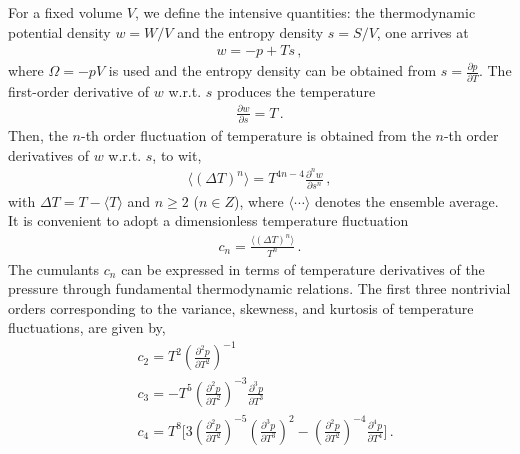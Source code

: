 \documentclass[aps,twocolumn,
prl,
superscriptaddress,nofootinbib,floatfix]{revtex4-2}
\begin{document}
For a fixed volume $V$, we define the intensive quantities:  the thermodynamic potential density $w=W/V$ and the entropy density $s=S/V$, one arrives at
\begin{align}
    w=-p+T s\,, \label{}
\end{align}
where $\Omega=-pV$ is used and the entropy density can be obtained from  $s=\frac{\partial p}{\partial T}$. The first-order derivative of $w$ w.r.t. $s$ produces the temperature
\begin{align}
    \frac{\partial w}{\partial s}=T\,. \label{}
\end{align}
Then, the $n$-th order fluctuation of temperature is obtained from the $n$-th order derivatives of $w$ w.r.t. $s$, to wit,
\begin{align}
    \langle(\Delta T)^n \rangle=T^{4n-4}\frac{\partial^n w}{\partial s^n}\,, \label{eq:DeltaTn}
\end{align}
with $\Delta T=T-\langle T \rangle$ and $n\geq 2$ ($n \in Z$), where $\langle \cdots \rangle$ denotes the ensemble average. It is convenient to adopt a dimensionless temperature fluctuation
\begin{align}
    c_n=\frac{\langle(\Delta T)^n \rangle}{T^n}\,. \label{eq:cn}
\end{align}
The cumulants $c_n$ can be expressed in terms of temperature derivatives of the pressure through fundamental thermodynamic relations. The first three nontrivial orders corresponding to the variance, skewness, and kurtosis of temperature fluctuations, are given by,
\begin{equation}\label{eq:c234}\begin{split}
    & c_2=T^2\left(\frac{\partial^2 p}{\partial T^2}\right)^{-1}\,\\[2ex]
    & c_3=-T^5\left(\frac{\partial^2 p}{\partial T^2}\right)^{-3}\frac{\partial^3 p}{\partial T^3}\,\\[2ex]
    & c_4=T^8\Bigg[3\left(\frac{\partial^2 p}{\partial T^2}\right)^{-5}\left(\frac{\partial^3 p}{\partial T^3}\right)^2-\left(\frac{\partial^2 p}{\partial T^2}\right)^{-4}\frac{\partial^4 p}{\partial T^4}\Bigg]\,.
\end{split} 
\end{equation}
\end{document}
